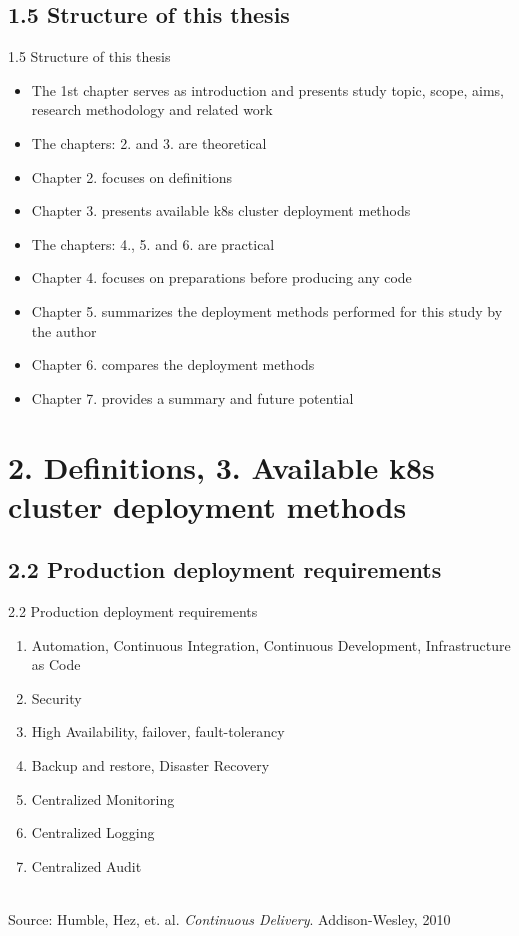 \documentclass{beamer}
\begin{document}
\subsection{1.5 Structure of this thesis}
\begin{frame}{1.5 Structure of this thesis}%
\begin{itemize}
	\item The 1st chapter serves as introduction and presents study topic, scope, aims, research methodology and related work  
	\item The chapters: 2. and 3. are theoretical 
	\item Chapter 2. focuses on definitions 
	\item Chapter 3. presents available k8s cluster deployment methods
	\item The chapters: 4., 5. and 6. are practical 
	\item Chapter 4. focuses on preparations before producing any code 
	\item Chapter 5. summarizes the deployment methods performed for this study by the author
	\item Chapter 6. compares the deployment methods 
	\item Chapter 7. provides a summary and future potential
\end{itemize}
\end{frame}

\section{2. Definitions, 3. Available k8s cluster deployment methods}
\subsection{2.2 Production deployment requirements}
\begin{frame}{2.2 Production deployment requirements}%
\begin{enumerate}
	\item Automation, Continuous Integration, Continuous Development, Infrastructure as Code
	\item Security
	\item High Availability, failover, fault-tolerancy
	\item Backup and restore, Disaster Recovery
	\item Centralized Monitoring
	\item Centralized Logging
	\item Centralized Audit
\end{enumerate}
\\
\tiny{Source: Humble, Hez, et. al. \textit{Continuous Delivery}. Addison-Wesley, 2010}
\end{frame}
\end{document}
